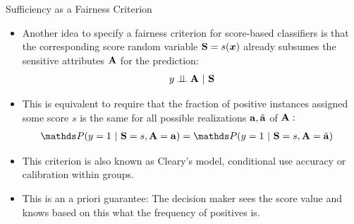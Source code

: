 \begin{vbframe}{Sufficiency as a Fairness Criterion}
	\small{
		\begin{itemize}
			\item Another idea to specify a fairness criterion for score-based classifiers is that the corresponding score random variable $\mathbf{S} = s(\bm{x})$ already subsumes the sensitive attributes $\mathbf{A}$ for the prediction: 
			$$	y \perp \!\!\! \perp \mathbf{A} ~|~ 	\mathbf{S}$$
%			
			\item This is equivalent to require that the fraction of positive instances assigned some score $s$ is the same for   all possible realizations $\mathbf{a},\tilde{\mathbf{a}}$ of $\mathbf{A}:$
			\begin{align*}
				&\P(  y = 1 ~|~ \mathbf{S} = s, \sens = \ba ) = \P(  y = 1 ~|~  \mathbf{S} = s, \sens = \batilde ) 
			\end{align*}
			\item This criterion is also known as Cleary's model, conditional use accuracy or calibration within groups.
			\item This is an a priori guarantee: The decision maker sees the score value and knows based on this what the frequency of positives is.
		\end{itemize}
	}
\end{vbframe}



